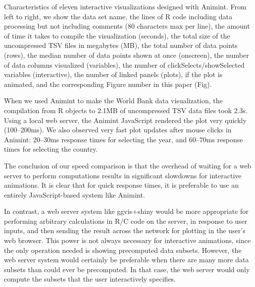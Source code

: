 \documentclass[10pt,journal,compsoc]{IEEEtran}\usepackage[]{graphicx}\usepackage[]{color}
\begin{document}
\begin{table}[b!]
  \centering
  
  \vskip 0.2cm
  \caption{Characteristics of eleven interactive visualizations designed with
    Animint. From left to right, we show the data set name, the
    lines of R code including data processing but not including comments
    (80 characters max per line),
    the amount of time it takes to compile the visualization (seconds),
    the total size of the uncompressed TSV files in megabytes (MB),
    the total number of data points (rows),
    the median number of data points shown at once (onscreen),
    the number of data columns visualized (variables),
    the number of clickSelects/showSelected variables (interactive),
    the number of linked panels (plots),
    if the plot is animated,
    and the corresponding Figure number in this paper (Fig).
  }
\label{tab:examples}
\end{table}

When we used Animint to make the World Bank data visualization, the
compilation from R objects to 2.1MB of uncompressed TSV data files
took 2.3s. Using a local web server, the Animint JavaScript rendered
the plot very quickly (100--200ms). We also observed very fast plot
updates after mouse clicks in Animint: 20--30ms response times for
selecting the year, and 60--70ms response times for selecting the
country.

The conclusion of our speed comparison is that the overhead of waiting
for a web server to perform computations results in significant
slowdowns for interactive animations. It is clear that for quick
response times, it is preferable to use an entirely JavaScript-based
system like Animint.

In contrast, a web server system like ggvis+shiny would be more
appropriate for
performing arbitrary calculations in R/C code on the server, in
response to user inputs, and then sending the result across the
network for plotting in the user's web browser. This power is not
always necessary for interactive animations, since the only operation
needed is showing precomputed data subsets. However, the web server
system would certainly be preferable when there are many more data
subsets than could ever be precomputed. In that case, the web server
would only compute the subsets that the user interactively specifies.
\end{document}
